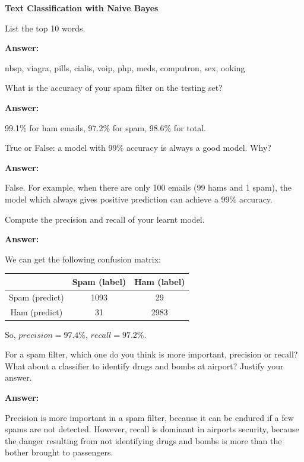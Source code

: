 \documentclass[12pt,twoside]{article}
\newcommand{\answer}{
 \par\medskip
 \textbf{Answer:}
}
\newcommand{\answerIIIIa}{ \answer
nbsp, viagra, pills, cialis, voip, php, meds, computron, sex, ooking
}
\newcommand{\answerIIIIb}{ \answer
99.1\% for ham emails, 97.2\% for spam, 98.6\% for total.
}
\newcommand{\answerIIIIc}{ \answer
False. For example, when there are only 100 emails (99 hams and 1 spam), the model which always gives positive prediction can achieve a 99\% accuracy.
}
\newcommand{\answerIIIId}{ \answer
We can get the following confusion matrix:
\begin{table}[h]
\centering
\begin{tabular}{|c|c|c|}
	\hline
	& Spam (label) & Ham (label) \\
	\hline
	Spam (predict) & 1093 & 29 \\
	\hline
	Ham (predict) & 31 & 2983 \\
	\hline
\end{tabular}
\end{table}

So, $precision=97.4\%$, $recall = 97.2\%$.
}
\newcommand{\answerIIIIe}{ \answer
Precision is more important in a spam filter, because it can be endured if a few spams are not detected. However, recall is dominant in airports security, because the danger resulting from not identifying drugs and bombs is more than the bother brought to passengers.
}
\begin{document}
\begin{problems}
\newpage

\problem  \textbf{Text Classification with Naive Bayes}

\begin{problemparts}
\problempart  List the top 10 words.

\answerIIIIa

\problempart What is the accuracy of your spam filter on the testing set?
\answerIIIIb

\problempart True or False: a model with 99\% accuracy is always a good model. Why?
\answerIIIIc

\problempart Compute the precision and recall of your learnt model.
\answerIIIId 

\problempart For a spam filter, which one do you think is more important, precision or recall? What about a classifier to identify drugs and bombs at airport? Justify your answer.
\answerIIIIe 

\end{problemparts}

\end{problems}
\end{document}
